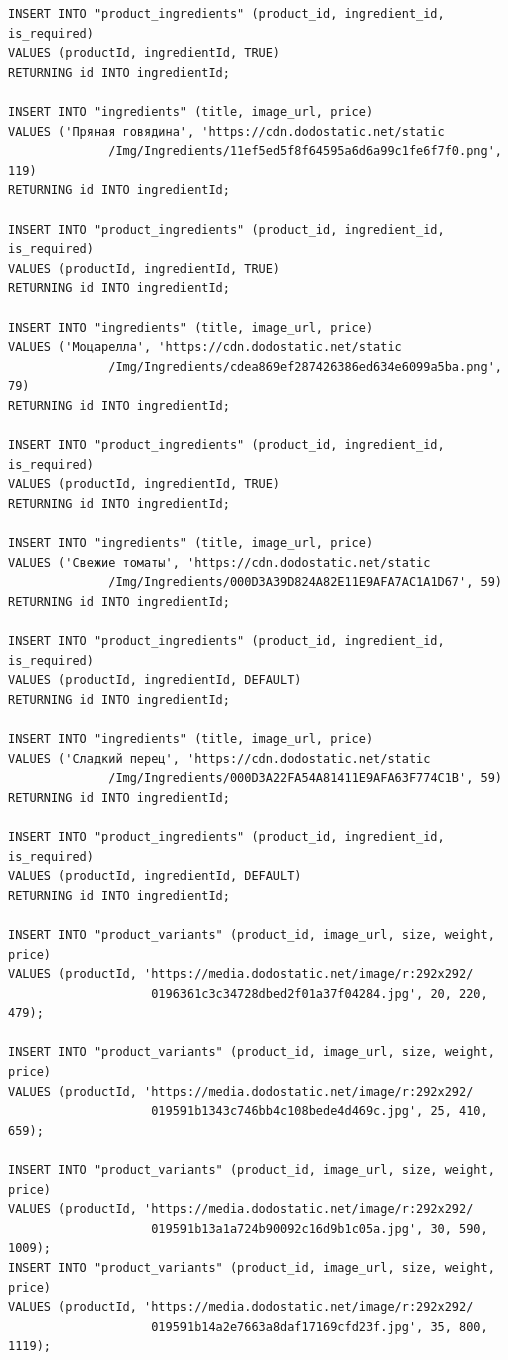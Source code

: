 \documentclass[a4paper,14pt]{extarticle}
\begin{document}
\begin{Verbatim}[tabsize=4,fontsize=\small]
INSERT INTO "product_ingredients" (product_id, ingredient_id, is_required)
VALUES (productId, ingredientId, TRUE)
RETURNING id INTO ingredientId;

INSERT INTO "ingredients" (title, image_url, price)
VALUES ('Пряная говядина', 'https://cdn.dodostatic.net/static
              /Img/Ingredients/11ef5ed5f8f64595a6d6a99c1fe6f7f0.png', 119)
RETURNING id INTO ingredientId;

INSERT INTO "product_ingredients" (product_id, ingredient_id, is_required)
VALUES (productId, ingredientId, TRUE)
RETURNING id INTO ingredientId;

INSERT INTO "ingredients" (title, image_url, price)
VALUES ('Моцарелла', 'https://cdn.dodostatic.net/static
              /Img/Ingredients/cdea869ef287426386ed634e6099a5ba.png', 79)
RETURNING id INTO ingredientId;

INSERT INTO "product_ingredients" (product_id, ingredient_id, is_required)
VALUES (productId, ingredientId, TRUE)
RETURNING id INTO ingredientId;

INSERT INTO "ingredients" (title, image_url, price)
VALUES ('Свежие томаты', 'https://cdn.dodostatic.net/static
              /Img/Ingredients/000D3A39D824A82E11E9AFA7AC1A1D67', 59)
RETURNING id INTO ingredientId;

INSERT INTO "product_ingredients" (product_id, ingredient_id, is_required)
VALUES (productId, ingredientId, DEFAULT)
RETURNING id INTO ingredientId;

INSERT INTO "ingredients" (title, image_url, price)
VALUES ('Сладкий перец', 'https://cdn.dodostatic.net/static
              /Img/Ingredients/000D3A22FA54A81411E9AFA63F774C1B', 59)
RETURNING id INTO ingredientId;

INSERT INTO "product_ingredients" (product_id, ingredient_id, is_required)
VALUES (productId, ingredientId, DEFAULT)
RETURNING id INTO ingredientId;

INSERT INTO "product_variants" (product_id, image_url, size, weight, price)
VALUES (productId, 'https://media.dodostatic.net/image/r:292x292/
                    0196361c3c34728dbed2f01a37f04284.jpg', 20, 220, 479);

INSERT INTO "product_variants" (product_id, image_url, size, weight, price)
VALUES (productId, 'https://media.dodostatic.net/image/r:292x292/
                    019591b1343c746bb4c108bede4d469c.jpg', 25, 410, 659);

INSERT INTO "product_variants" (product_id, image_url, size, weight, price)
VALUES (productId, 'https://media.dodostatic.net/image/r:292x292/
                    019591b13a1a724b90092c16d9b1c05a.jpg', 30, 590, 1009);
INSERT INTO "product_variants" (product_id, image_url, size, weight, price)
VALUES (productId, 'https://media.dodostatic.net/image/r:292x292/
                    019591b14a2e7663a8daf17169cfd23f.jpg', 35, 800, 1119);


\end{Verbatim}
\end{document}
